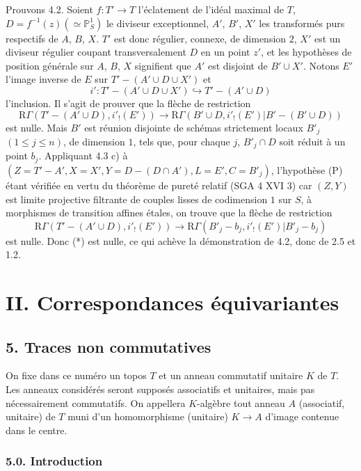 \documentclass[11pt]{article}
\begin{document}
Prouvons 4.2. Soient $f:T'\to T$ l'éclatement de l'idéal maximal de $T$, $D=f^{-1}(z)(\simeq\mathbb P^1_S)$ le diviseur exceptionnel, $A'$, $B'$, $X'$ les transformés purs respectifs de $A$, $B$, $X$. $T'$ est donc régulier, connexe, de dimension $2$, $X'$ est un diviseur régulier coupant transversalement $D$ en un point $z'$, et les hypothèses de position générale sur $A$, $B$, $X$ signifient que $A'$ est disjoint de $B'\cup X'$. Notons $E'$ l'image inverse de $E$ sur $T'-(A'\cup D\cup X')$ et
\[
i':T'-(A'\cup D\cup X')\hookrightarrow T'-(A'\cup D)
\]
l'inclusion. Il s'agit de prouver que la flèche de restriction
\begin{equation}
\mathrm R\Gamma(T'-(A'\cup D),i'_!(E'))
\longrightarrow
\mathrm R\Gamma(B'\cup D,i'_!(E')|B'-(B'\cup D))
\tag{*}
\end{equation}
est nulle. Mais $B'$ est réunion disjointe de schémas strictement locaux $B'_j$ $(1\le j\le n)$, de dimension $1$, tels que, pour chaque $j$, $B'_j\cap D$ soit réduit à un point $b_j$. Appliquant 4.3 c) à $(Z=T'-A', X=X', Y=D-(D\cap A'), L=E', C=B'_j)$, l'hypothèse (P) étant vérifiée en vertu du théorème de pureté relatif (SGA 4 XVI 3) car $(Z,Y)$ est limite projective filtrante de couples lisses de codimension $1$ sur $S$, à morphismes de transition affines étales, on trouve que la flèche de restriction
\[
\mathrm R\Gamma(T'-(A'\cup D),i'_!(E'))
\longrightarrow
\mathrm R\Gamma(B'_j-b_j,i'_!(E')|B'_j-b_j)
\]
est nulle. Donc (*) est nulle, ce qui achève la démonstration de 4.2, donc de 2.5 et 1.2.

\section*{II. Correspondances équivariantes}

\subsection*{5. Traces non commutatives}

On fixe dans ce numéro un topos $T$ et un anneau commutatif unitaire $K$ de $T$. Les anneaux considérés seront supposés associatifs et unitaires, mais pas nécessairement commutatifs. On appellera $K$-algèbre tout anneau $A$ (associatif, unitaire) de $T$ muni d'un homomorphisme (unitaire) $K\to A$ d'image contenue dans le centre.

\subsubsection*{5.0. Introduction}
\end{document}
